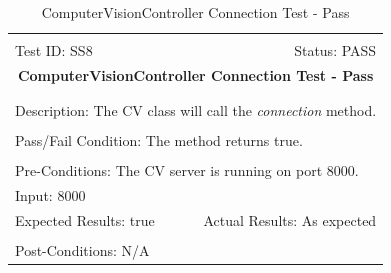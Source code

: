 \documentclass[11pt]{article}
\begin{document}
\begin{center}
\begin{table}[H]
\begin{tabular}{|l r|}\hline&\\[-2mm]
	Test ID: SS8	&Status: PASS\\[-3mm]
	\multicolumn{2}{|c|}{\textbf{\large{ComputerVisionController Connection Test - Pass}}}\\&\\\hline&\\[-3mm]
	\multicolumn{2}{|p{\textwidth}|}{Description: The CV class will call the \textit{connection} method.}\\[1mm]\hline&\\[-3mm]
	\multicolumn{2}{|p{\textwidth}|}{Pass/Fail Condition: The method returns true.}\\[1mm]\hline&\\[-3mm]
	\multicolumn{2}{|p{\textwidth}|}{Pre-Conditions: The CV server is running on port 8000.}\\[4mm]
	\multicolumn{2}{|p{\textwidth}|}{Input: 8000}\\[2mm]\hline
	\multicolumn{1}{|p{0.49\textwidth}}{Expected Results: true}	&\multicolumn{1}{|p{0.45\textwidth}|}{Actual Results: As expected}\\\hline&\\[-3mm]
	\multicolumn{2}{|p{\textwidth}|}{Post-Conditions: N/A}\\\hline
\end{tabular}
\caption{ComputerVisionController Connection Test - Pass}
\end{table}
\end{center}
\end{document}
